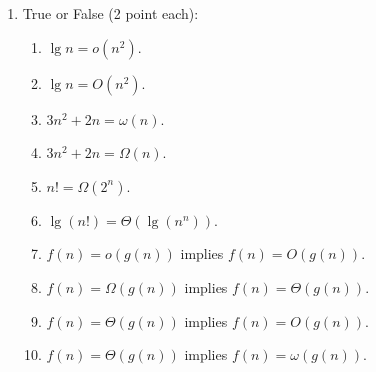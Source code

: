 \newpage
\begin{enumerate}

    \item True or False (2 point each):
        \begin{enumerate}
    	    \item \underline{\hspace{.25in}} $\lg n = o(n^2)$.
    	    \item \underline{\hspace{.25in}} $\lg n = O(n^2)$.   
    	    \item \underline{\hspace{.25in}} $3n^2 + 2n = \omega(n)$.
    	    \item \underline{\hspace{.25in}} $3n^2 + 2n = \Omega(n)$.  

    	    \item \underline{\hspace{.25in}} $n! = \Omega(2^n)$.	        	    \item \underline{\hspace{.25in}} $\lg(n!) = \Theta(\lg(n^n))$.	 	    	 
    	     \item \underline{\hspace{.25in}} $f(n) = o(g(n))$ implies 
    	    	$f(n) = O(g(n))$.
    	    \item \underline{\hspace{.25in}} $f(n) = \Omega(g(n))$ implies 
    	    	$f(n) = \Theta(g(n))$.
    	    \item \underline{\hspace{.25in}} $f(n) = \Theta(g(n))$ implies 
    	    	$f(n) = O(g(n))$.
    	    \item \underline{\hspace{.25in}} $f(n) = \Theta(g(n))$ implies 
    	    	$f(n) = \omega(g(n))$.
    	    		    	 

\end{enumerate}
\end{enumerate}
